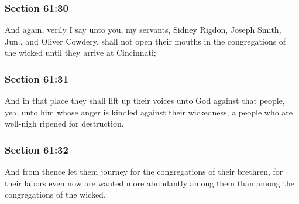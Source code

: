 	\subsubsection{Section 61:30} %
		\label{DC61-30}

		And again, verily I say unto you, my servants, Sidney Rigdon, Joseph Smith, Jun., and Oliver Cowdery, shall not open their mouths in the congregations of the wicked until they arrive at Cincinnati;


	\subsubsection{Section 61:31} %
		\label{DC61-31}

		And in that place they shall lift up their voices unto God against that people, yea, unto him whose anger is kindled against their wickedness, a people who are well-nigh ripened for destruction.


	\subsubsection{Section 61:32} %
		\label{DC61-32}

		And from thence let them journey for the congregations of their brethren, for their labors even now are wanted more abundantly among them than among the congregations of the wicked.


